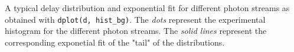A typical delay distribution and exponential fit for different photon streams as obtained with \verb|dplot(d, hist_bg)|.
The \textit{dots} represent the experimental histogram for the different photon streams.
The \textit{solid lines} represent the corresponding exponetial fit of the "tail" of the distributions.